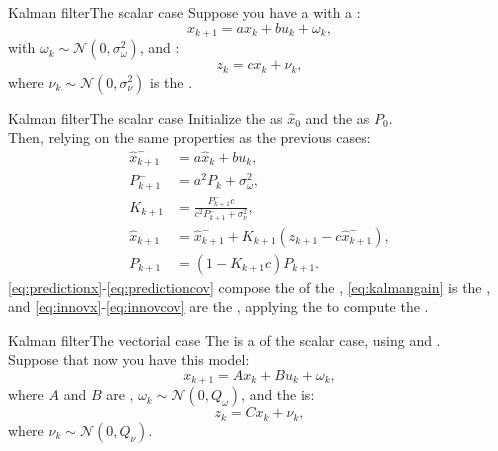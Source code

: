 \begin{frame}{Kalman filter}{The scalar case}
  Suppose you have a  with a :
  \begin{equation}
    x_{k+1} = ax_k + bu_k + \omega_k,
  \end{equation}
  with $\omega_k \sim \mathcal{N}(0,\sigma_{\omega}^2)$, and :
  \begin{equation}
    z_k = cx_k + \nu_k,
  \end{equation}
  where $\nu_k \sim \mathcal{N}(0,\sigma_{\nu}^2)$ is the .
\end{frame}
\begin{frame}{Kalman filter}{The scalar case}
  Initialize the  as $\hat{x}_0$ and the  as $P_0$.\\
  Then, relying on the same properties as the previous cases:
  \begin{subequations}
    \begin{align}
      \hat{x}_{k+1}^{-} &= a\hat{x}_k + bu_k,\label{eq:predictionx}\\
      P_{k+1}^{-} &= a^2P_k + \sigma_{\omega}^2,\label{eq:predictioncov}\\
      K_{k+1} &= \frac{P_{k+1}^{-}c}{c^2P_{k+1}^{-} + \sigma_{\nu}^2},\label{eq:kalmangain}\\
      \hat{x}_{k+1} &= \hat{x}_{k+1}^{-} + K_{k+1}(z_{k+1} - c\hat{x}_{k+1}^{-}),\label{eq:innovx}\\
      P_{k+1} &= (1 - K_{k+1}c)P_{k+1}.\label{eq:innovcov}
    \end{align}
  \end{subequations}
  \eqref{eq:predictionx}-\eqref{eq:predictioncov} compose the  of the , \eqref{eq:kalmangain} is the , and \eqref{eq:innovx}-\eqref{eq:innovcov} are the , applying the  to compute the .
\end{frame}
\begin{frame}{Kalman filter}{The vectorial case}
  The  is a  of the scalar case, using  and .\\
  Suppose that now you have this model:
  \begin{equation}
    x_{k+1} = Ax_k + Bu_k + \omega_k,
  \end{equation}
  where $A$ and $B$ are , $\omega_k \sim \mathcal{N}(0,Q_{\omega})$, and the  is:
  \begin{equation}
    z_k = Cx_k + \nu_k,
  \end{equation}
  where $\nu_k \sim \mathcal{N}(0,Q_{\nu})$.
\end{frame}

